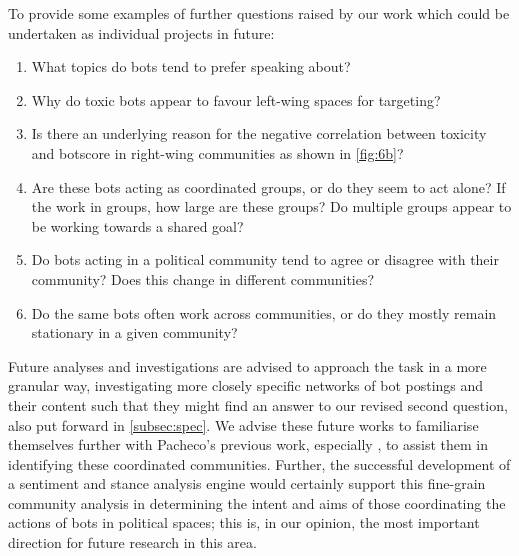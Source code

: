 \documentclass[a4paper,11pt]{article}  %
\begin{document}
	To provide some examples of further questions raised by our work which could be undertaken as individual projects in future:
	\begin{enumerate}
		\item What topics do bots tend to prefer speaking about?
		\item Why do toxic bots appear to favour left-wing spaces for targeting?
		\item Is there an underlying reason for the negative correlation between toxicity and botscore in right-wing communities as shown in \autoref{fig:6b}?
		\item Are these bots acting as coordinated groups, or do they seem to act alone? If the work in groups, how large are these groups? Do multiple groups appear to be working towards a shared goal?
		\item Do bots acting in a political community tend to agree or disagree with their community? Does this change in different communities?
		\item Do the same bots often work across communities, or do they mostly remain stationary in a given community?
	\end{enumerate}
	
	Future analyses and investigations are advised to approach the task in a more granular way, investigating more closely specific networks of bot postings and their content such that they might find an answer to our revised second question, also put forward in \autoref{subsec:spec}. We advise these future works to familiarise themselves further with Pacheco's previous work, especially \textcite{pachecoUncoveringCoordinatedNetworks2021}, to assist them in identifying these coordinated communities. Further, the successful development of a sentiment and stance analysis engine would certainly support this fine-grain community analysis in determining the intent and aims of those coordinating the actions of bots in political spaces; this is, in our opinion, the most important direction for future research in this area.
	
\end{document}
